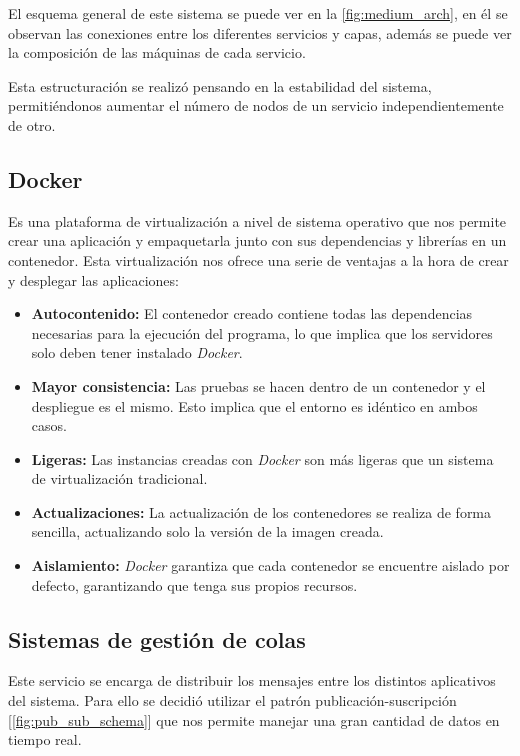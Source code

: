 El esquema general de este sistema se puede ver en la \cref{fig:medium_arch}, en él se observan las conexiones entre los diferentes servicios y capas, además se puede ver la composición de las máquinas de cada servicio.



Esta estructuración se realizó pensando en la estabilidad del sistema, permitiéndonos aumentar el número de nodos de un servicio independientemente de otro.

\subsection{Docker}

Es una plataforma de virtualización a nivel de sistema operativo que nos permite crear una aplicación y empaquetarla junto con sus dependencias y librerías en un contenedor. Esta virtualización nos ofrece una serie de ventajas a la hora de crear y desplegar las aplicaciones:

\begin{itemize}[noitemsep]
    \item \textbf{Autocontenido:} El contenedor creado contiene todas las dependencias necesarias para la ejecución del programa, lo que implica que los servidores solo deben tener instalado \textit{Docker}.
    \item \textbf{Mayor consistencia:} Las pruebas se hacen dentro de un contenedor y el despliegue es el mismo. Esto implica que el entorno es idéntico en ambos casos.
    \item \textbf{Ligeras:} Las instancias creadas con \textit{Docker} son más ligeras que un sistema de virtualización tradicional.
    \item \textbf{Actualizaciones:} La actualización de los contenedores se realiza de forma sencilla, actualizando solo la versión de la imagen creada.
    \item \textbf{Aislamiento:} \textit{Docker} garantiza que cada contenedor se encuentre aislado por defecto, garantizando que tenga sus propios recursos.
\end{itemize}


\subsection{Sistemas de gestión de colas}
Este servicio se encarga de distribuir los mensajes entre los distintos aplicativos del sistema. Para ello se decidió utilizar el patrón publicación-suscripción [\cref{fig:pub_sub_schema}] que nos permite manejar una gran cantidad de datos en tiempo real.

